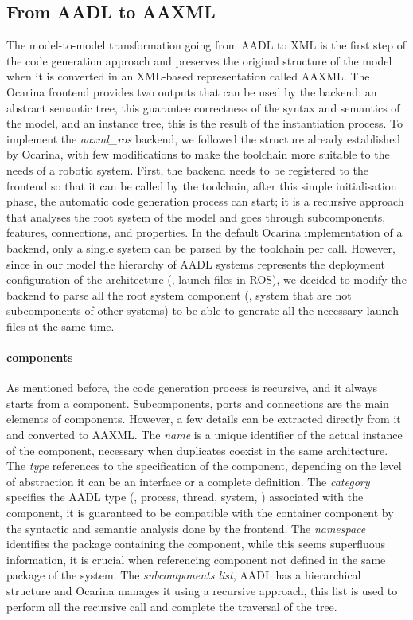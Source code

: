 \subsection{From AADL to AAXML}
\label{sec:aadl-to-aaxml}
The model-to-model transformation going from AADL to XML is the first step of the code generation approach and preserves the original structure of the model when it is converted in an XML-based representation called AAXML. The Ocarina frontend provides two outputs that can be used by the backend: an abstract semantic tree, this guarantee correctness of the syntax and semantics of the model, and an instance tree, this is the result of the instantiation process. To implement the \textit{aaxml\_ros} backend, we followed the structure already established by Ocarina, with few modifications to make the toolchain more suitable to the needs of a robotic system. First, the backend needs to be registered to the frontend so that it can be called by the toolchain, after this simple initialisation phase, the automatic code generation process can start; it is a recursive approach that analyses the root system of the model and goes through subcomponents, features, connections, and properties. In the default Ocarina implementation of a backend, only a single system can be parsed by the toolchain per call. However, since in our model the hierarchy of AADL systems represents the deployment configuration of the architecture (\ie, launch files in ROS), we decided to modify the backend to parse all the root system component (\ie, system that are not subcomponents of other systems) to be able to generate all the necessary launch files at the same time.

\paragraph{components} As mentioned before, the code generation process is recursive, and it always starts from a component. Subcomponents, ports and connections are the main elements of components. However, a few details can be extracted directly from it and converted to AAXML. The \textit{name} is a unique identifier of the actual instance of the component, necessary when duplicates coexist in the same architecture. The \textit{type} references to the specification of the component, depending on the level of abstraction it can be an interface or a complete definition. The \textit{category} specifies the AADL type (\eg, process, thread, system, \etc) associated with the component, it is guaranteed to be compatible with the container component by the syntactic and semantic analysis done by the frontend. The \textit{namespace} identifies the package containing the component, while this seems superfluous information, it is crucial when referencing component not defined in the same package of the system. The \textit{subcomponents list}, AADL has a hierarchical structure and Ocarina manages it using a recursive approach, this list is used to perform all the recursive call and complete the traversal of the tree.

